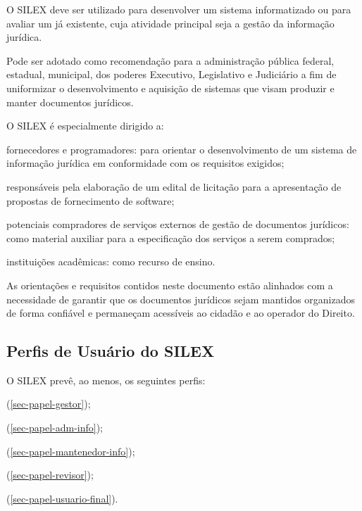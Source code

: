 \documentclass[a4paper,11pt,openright,twoside,english,brazil]{abntex2}
\begin{document}
O SILEX deve ser utilizado para desenvolver um sistema informatizado ou para
avaliar um já existente, cuja atividade principal seja a gestão da informação jurídica.

Pode ser adotado como recomendação para a administração pública federal,
estadual, municipal, dos poderes Executivo, Legislativo e Judiciário a fim de
uniformizar o desenvolvimento e aquisição de sistemas que visam produzir e
manter documentos jurídicos.

O SILEX é especialmente dirigido a:

\begin{alineas}
 \item fornecedores e programadores: para orientar o desenvolvimento de um
 sistema de informação jurídica em conformidade com os requisitos exigidos;
 \item responsáveis pela elaboração de um edital de licitação para a
 apresentação de propostas de fornecimento de software;
 \item potenciais compradores de serviços externos de gestão de documentos
 jurídicos: como material auxiliar para a especificação dos serviços a serem
 comprados;
 \item instituições acadêmicas: como recurso de ensino.
\end{alineas}

As orientações e requisitos contidos neste documento estão alinhados com a
necessidade de garantir que os documentos jurídicos sejam mantidos organizados
de forma confiável e permaneçam acessíveis ao cidadão e ao operador do Direito.

\subsection{Perfis de Usuário do SILEX}

O SILEX prevê, ao menos, os seguintes perfis:

\begin{alineas}
 \item {} (\autoref{sec-papel-gestor});
 \item {} (\autoref{sec-papel-adm-info});
 \item {}
 (\autoref{sec-papel-mantenedor-info});
 \item {} (\autoref{sec-papel-revisor});
 \item {} (\autoref{sec-papel-usuario-final}).
\end{alineas}
\end{document}
